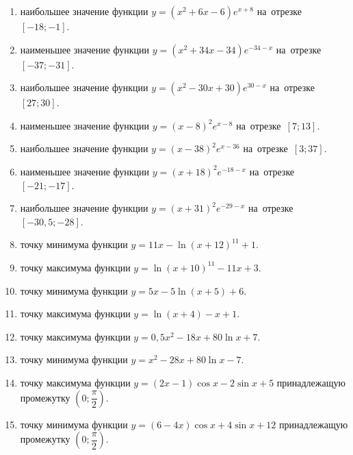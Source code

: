 \documentclass[a4paper,10pt]{article}
\begin{document}
\begin{enumerate}
\item {} наибольшее значение функции $y=\left(x^2 +6x -6\right)e^{x+8}$ на~отрезке~$\left[-18;-1\right]$.

\item {} наименьшее значение функции $y=\left(x^2 +34x -34\right)e^{-34-x}$ на~отрезке~$\left[-37;-31\right]$.

\item {} наибольшее значение функции $y=\left(x^2 -30x +30\right)e^{30-x}$ на~отрезке~$\left[27;30\right]$.

\item {} наименьшее значение функции $y=\left(x-8\right)^2e^{x-8}$ на~отрезке~$\left[7;13\right]$.

\item {} наибольшее значение функции $y=\left(x-38\right)^2e^{x-36}$ на~отрезке~$\left[3;37\right]$.

\item {} наименьшее значение функции $y=\left(x+18\right)^2e^{-18-x}$ на~отрезке~$\left[-21;-17\right]$.

\item {} наибольшее значение функции $y=\left(x+31\right)^2e^{-29-x}$ на~отрезке~$\left[-30,5;-28\right]$.

\item {} точку минимума функции $y=11x-\ln\left(x+12\right)^{11}+1$.

\item {} точку максимума функции $y=\ln\left(x+10\right)^{11}-11x+3$.

\item {} точку минимума функции $y=5x-5\ln\left(x+5\right)+6$.

\item {} точку максимума функции $y=\ln\left(x+4\right)-x+1$.

\item {} точку максимума функции $y=0,5x^2-18x+80\ln x +7$.

\item {} точку минимума функции $y=x^2-28x+80\ln x -7$.

\item {} точку максимума функции $y=\left(2x-1\right)\cos x -2\sin x+5$
принадлежащую промежутку $\left(0;\dfrac{\pi}{2}\right)$.

\item {} точку минимума функции $y=\left(6-4x\right)\cos x +4\sin x+12$
принадлежащую промежутку $\left(0;\dfrac{\pi}{2}\right)$.


\end{enumerate}
\end{document}
